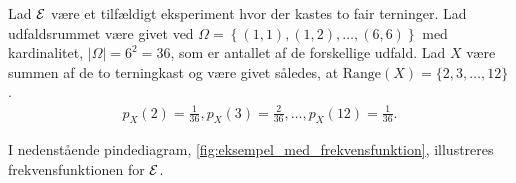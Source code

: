 \begin{eks} \textbf{}\label{eks:frekvensfunktion_med_terninger} %
\newline
Lad $\mathcal{E}$ være et tilfældigt eksperiment hvor der kastes to fair terninger. Lad udfaldsrummet være givet ved %
$\Omega=\left\{(1,1),(1,2),\dots,(6,6)\right\}$ med kardinalitet, $|\Omega|=6^2 = 36$, som er antallet af de forskellige udfald.
Lad $X$ være summen af de to terningkast og være givet således, at $\text{Range}(X)=\{2, 3, \dots , 12\}$.
%
\begin{align*}
    p_X(2)=\frac{1}{36}, 
    p_X(3)=\frac{2}{36}, 
    \dots, 
    p_X(12)=\frac{1}{36}.
\end{align*}


%
I nedenstående pindediagram, \autoref{fig:eksempel_med_frekvensfunktion}, illustreres frekvensfunktionen for $\mathcal{E}$.  



\end{eks}
